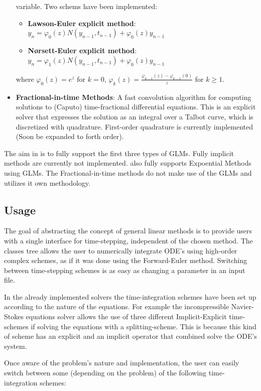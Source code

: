\begin{itemize}
    variable. Two schems have been implemented:
  \begin{itemize}
    \item \textbf{Lawson-Euler explicit method}: $y_n =
      \varphi_0(z)N(y_{n-1},t_{n-1}) + \varphi_0(z)y_{n-1}$
    \item \textbf{N{\o}rsett-Euler explicit method}: $y_n =
      \varphi_1(z)N(y_{n-1},t_{n-1}) + \varphi_0(z)y_{n-1}$
  \end{itemize}
where $\varphi_0(z) = e^{z}$ for $k = 0$, $\varphi_{k}(z) =
\frac{\varphi_{k-1}(z) - \varphi_{k-1}(0)}{z}$ for $k \geq 1$.
  \item \textbf{Fractional-in-time Methods}: A fast convolution
    algorithm for computing solutions to (Caputo) time-fractional
    differential equations. This is an explicit solver that expresses
    the solution as an integral over a Talbot curve, which is
    discretized with quadrature. First-order quadrature is currently
    implemented (Soon be expanded to forth order).

\end{itemize}

The aim in {\nek} is to fully support the first three types of GLMs.
Fully implicit methods are currently not implemented. {\nek} also
fully supports Expoential Methods using GLMs. The Fractional-in-time
methods do not make use of the GLMs and utilizes it own methodology.

\subsection{Usage}
The goal of abstracting the concept of general linear methods is to provide
users with a single interface for time-stepping, independent of the chosen
method. The classes tree allows the user to numerically integrate ODE's using
high-order complex schemes, as if it was done using the Forward-Euler method.
Switching between time-stepping schemes is as easy as changing a parameter in an
input file.

In the already implemented solvers the time-integration schemes have been set up
according to the nature of the equations.
For example the incompressible Navier-Stokes equations solver allows the use of
three different Implicit-Explicit time-schemes if solving the equations with a
splitting-scheme.
This is because this kind of scheme has an explicit and an implicit operator
that combined solve the ODE's system.

Once aware of the problem's nature and implementation, the user can easily
switch between some (depending on the problem) of the following
time-integration schemes:

